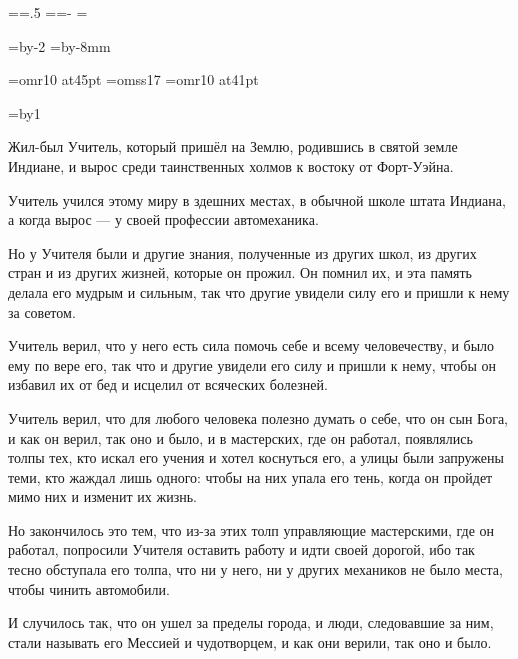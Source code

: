 \pdfpagewidth=297mm
\pdfpageheight=210mm
 \pdfhorigin=1in \pdfvorigin=1in
\shhtotal=\pdfpagewidth \htotal=.5\shhtotal
\vtotal=\pdfpageheight \shvoffset=-\pdfvorigin
\shoutline=0pt
\shstaplewidth=0pt
\shcrop=0pt
\shfootline={}

\horigin=4.5mm
\vorigin=2.5mm
\hsize=\htotal \advance\hsize by-2\horigin
\vsize=\vtotal \advance\vsize by-8mm

\font\chapfont=omr10 at45pt
\font\handfont=omss17
\font\bukvfont=omr10 at41pt

\nopagenumbers

\raggedbottom

{}
\vskip3cm

\begingroup
\baselineskip=17pt
\newcount\n
\everypar={\advance\n by1 \hang}
\parskip=30pt
\handfont

Жил-был Учитель, который пришёл на Землю, родившись в святой земле Индиане, и вырос среди таинственных холмов к востоку от Форт-Уэйна.

Учитель учился этому миру в здешних местах, в обычной школе штата Индиана, а когда вырос --- у своей профессии автомеханика.

Но у Учителя были и другие знания, полученные из других школ, из других стран и из других жизней, которые он прожил. Он помнил их, и эта память делала его мудрым и сильным, так что другие увидели силу его и пришли к нему за советом.

Учитель верил, что у него есть сила помочь себе и всему человечеству, и было ему по вере его, так что и другие увидели его силу и пришли к нему, чтобы он избавил их от бед и исцелил от всяческих болезней.

Учитель верил, что для любого человека полезно думать о себе, что он сын Бога, и как он верил, так оно и было, и в мастерских, где он работал, появлялись толпы тех, кто искал его учения и хотел коснуться его, а улицы были запружены теми, кто жаждал лишь одного: чтобы на них упала его тень, когда он пройдет мимо них и изменит их жизнь.

Но закончилось это тем, что из-за этих толп управляющие мастерскими, где он работал, попросили Учителя оставить работу и идти своей дорогой, ибо так тесно обступала его толпа, что ни у него, ни у других механиков не было места, чтобы чинить автомобили.

И случилось так, что он ушел за пределы города, и люди, следовавшие за ним, стали называть его Мессией и чудотворцем, и как они верили, так оно и было.

